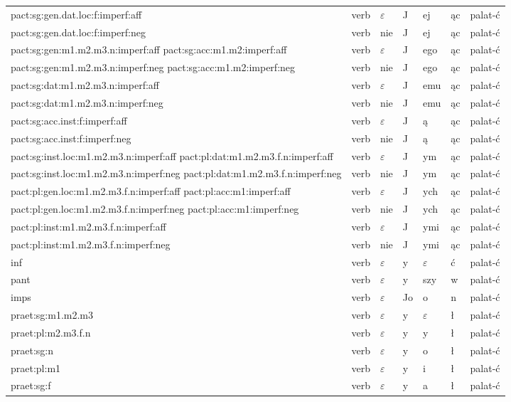 \documentclass{article}
\begin{document}
\begin{longtable}{p{7cm}|l|l|l|l|l|l}
pact:sg:gen.dat.loc:f:imperf:aff & verb & $\varepsilon$ & J & ej & ąc & palat-ć\\
pact:sg:gen.dat.loc:f:imperf:neg & verb & nie & J & ej & ąc & palat-ć\\
pact:sg:gen:m1.m2.m3.n:imperf:aff pact:sg:acc:m1.m2:imperf:aff & verb & $\varepsilon$ & J & ego & ąc & palat-ć\\
pact:sg:gen:m1.m2.m3.n:imperf:neg pact:sg:acc:m1.m2:imperf:neg & verb & nie & J & ego & ąc & palat-ć\\
pact:sg:dat:m1.m2.m3.n:imperf:aff & verb & $\varepsilon$ & J & emu & ąc & palat-ć\\
pact:sg:dat:m1.m2.m3.n:imperf:neg & verb & nie & J & emu & ąc & palat-ć\\
pact:sg:acc.inst:f:imperf:aff & verb & $\varepsilon$ & J & ą & ąc & palat-ć\\
pact:sg:acc.inst:f:imperf:neg & verb & nie & J & ą & ąc & palat-ć\\
pact:sg:inst.loc:m1.m2.m3.n:imperf:aff pact:pl:dat:m1.m2.m3.f.n:imperf:aff & verb & $\varepsilon$ & J & ym & ąc & palat-ć\\
pact:sg:inst.loc:m1.m2.m3.n:imperf:neg pact:pl:dat:m1.m2.m3.f.n:imperf:neg & verb & nie & J & ym & ąc & palat-ć\\
pact:pl:gen.loc:m1.m2.m3.f.n:imperf:aff pact:pl:acc:m1:imperf:aff & verb & $\varepsilon$ & J & ych & ąc & palat-ć\\
pact:pl:gen.loc:m1.m2.m3.f.n:imperf:neg pact:pl:acc:m1:imperf:neg & verb & nie & J & ych & ąc & palat-ć\\
pact:pl:inst:m1.m2.m3.f.n:imperf:aff & verb & $\varepsilon$ & J & ymi & ąc & palat-ć\\
pact:pl:inst:m1.m2.m3.f.n:imperf:neg & verb & nie & J & ymi & ąc & palat-ć\\
inf & verb & $\varepsilon$ & y & $\varepsilon$ & ć & palat-ć\\
pant & verb & $\varepsilon$ & y & szy & w & palat-ć\\
imps & verb & $\varepsilon$ & Jo & o & n & palat-ć\\
praet:sg:m1.m2.m3 & verb & $\varepsilon$ & y & $\varepsilon$ & ł & palat-ć\\
praet:pl:m2.m3.f.n & verb & $\varepsilon$ & y & y & ł & palat-ć\\
praet:sg:n & verb & $\varepsilon$ & y & o & ł & palat-ć\\
praet:pl:m1 & verb & $\varepsilon$ & y & i & ł & palat-ć\\
praet:sg:f & verb & $\varepsilon$ & y & a & ł & palat-ć\\

\end{longtable}
\end{document}

